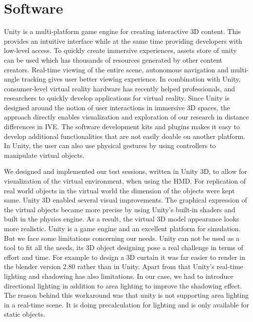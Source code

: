 \section{Software}
Unity is a multi-platform game engine for creating interactive 3D content. This provides an intuitive interface while at the same time providing developers with low-level access. To quickly create immersive experiences, assets store of unity can be used which has thousands of resources generated by other content creators. Real-time viewing of the entire scene, autonomous navigation and multi-angle tracking gives user better viewing experience.
In combination with Unity, consumer-level virtual reality hardware has recently helped professionals, and researchers to quickly develop applications for virtual reality.  
Since Unity is designed around the notion of user interactions in immersive 3D spaces, the approach directly enables visualization and exploration of our research in distance differences in IVE. The software development kits and plugins makes it easy to develop additional functionalities that are not easily doable on another platform. In Unity, the user can also use physical gestures by using controllers to manipulate virtual objects. \par
We designed and implemented our test sessions, written in Unity 3D, to allow for visualization of the virtual environment, when using the HMD. For replication of real world objects in the virtual world the dimension of the objects were kept same. Unity 3D enabled several visual improvements. The graphical expression of the virtual objects became more precise by using Unity’s built-in shaders and built in the physics engine. As a result, the virtual 3D model appearance looks more realistic. Unity is a game engine and an excellent platform for simulation. But we face some limitations concerning our needs. Unity can not be used as a tool to fit all the needs, its 3D object designing pose a real challenge in terms of effort and time. For example to design a 3D curtain it was far easier to render in the blender version 2.80 rather than in Unity. Apart from that Unity’s real-time lighting and shadowing has also limitations. In our case, we had to introduce directional lighting in addition to area lighting to improve the shadowing effect. The reason behind this workaround was that unity is not supporting area lighting in a real-time scene. It is doing precalculation for lighting and is only available for static objects.   
\raggedbottom
